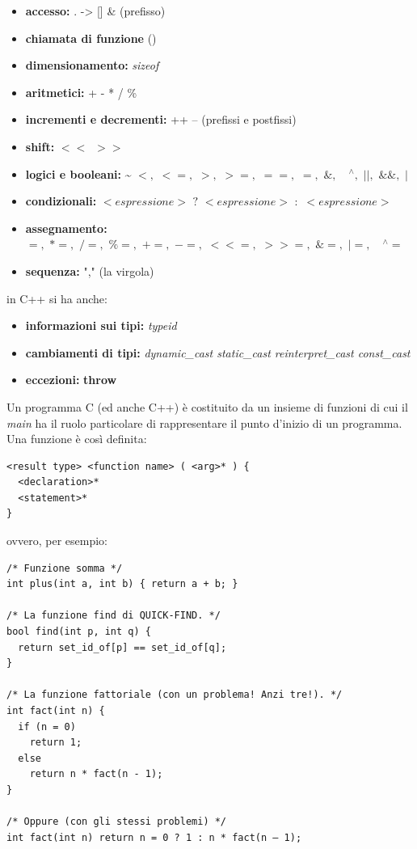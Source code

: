 \documentclass[a4paper,12pt, oneside]{book}
\begin{document}
	\begin{itemize}
		\item \textbf{accesso:} . -> [] \& (prefisso)
		\item \textbf{chiamata di funzione} ()
		\item \textbf{dimensionamento:} \textit{sizeof}
		\item \textbf{aritmetici:} + - * / \%
		\item \textbf{incrementi e decrementi:} ++ -- (prefissi e postfissi)
		\item \textbf{shift:} $<<\,\,\,>>$
		\item \textbf{logici e booleani:} \~ \! $<,\,\,<=,\,\,>,\,\,>=,\,\,==,\,\,=,\,\, \&,\,\, \mbox{ }^{\wedge},\,\, ||,\,\, \&\&,\,\, |$
		\item \textbf{condizionali:} $<espressione>\,\, ?\,\,<espressione>\,\, :\,\, <espressione>$
		\item \textbf{assegnamento:} $=,\,\,*=,\,\,/=,\,\,\%=,\,\,+=,\,\,-=,\,\,<<=,\,\,>>=,\,\,\&=,\,\,|=,\,\,\mbox{ }^{\wedge}=$
		\item \textbf{sequenza:} "," (la virgola)
	\end{itemize}
	in C++ si ha anche:
	\begin{itemize}
		\item \textbf{informazioni sui tipi:} \textit{typeid}
		\item \textbf{cambiamenti di tipi:} \textit{dynamic\_cast static\_cast reinterpret\_cast
			      const\_cast}
		\item \textbf{eccezioni:} \textbf{throw}
	\end{itemize}
	Un programma C (ed anche C++) è costituito da un insieme di
	funzioni di cui il \textit{main} ha il ruolo particolare di
	rappresentare il punto d'inizio di un programma. Una funzione è così definita:
	\begin{verbatim}
<result type> <function name> ( <arg>* ) {
  <declaration>*
  <statement>*
}
\end{verbatim}
	ovvero, per esempio:
	\begin{verbatim}
/* Funzione somma */
int plus(int a, int b) { return a + b; }

/* La funzione find di QUICK-FIND. */
bool find(int p, int q) {
  return set_id_of[p] == set_id_of[q];
}

/* La funzione fattoriale (con un problema! Anzi tre!). */
int fact(int n) {
  if (n = 0)
    return 1;
  else
    return n * fact(n - 1);
}

/* Oppure (con gli stessi problemi) */
int fact(int n) return n = 0 ? 1 : n * fact(n – 1);
\end{verbatim}
\end{document}
